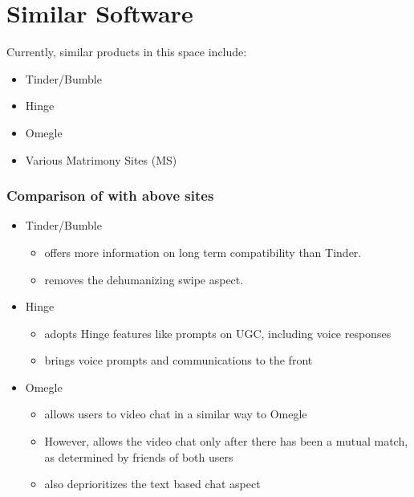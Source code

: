 \section{Similar Software}
Currently, similar products in this space include:
\begin{itemize}
    \item Tinder/Bumble
    \item Hinge
    \item Omegle
    \item Various Matrimony Sites (MS)
\end{itemize}

\subsubsection{Comparison of \serviceName with above sites}
\begin{itemize}
    \item Tinder/Bumble
    \begin{itemize}
        \item \serviceName offers more information on long term compatibility than Tinder.
        \item \serviceName removes the dehumanizing swipe aspect.
    \end{itemize}
    \item Hinge
    \begin{itemize}
        \item \serviceName adopts Hinge features like prompts on UGC, including voice responses
        \item \serviceName brings voice prompts and communications to the front
    \end{itemize}
    \item Omegle
    \begin{itemize}
        \item \serviceName allows users to video chat in a similar way to Omegle
        \item However, \serviceName allows the video chat only after there has been a mutual match,
        as determined by friends of both users
        \item \serviceName also deprioritizes the text based chat aspect
    \end{itemize}
\end{itemize}